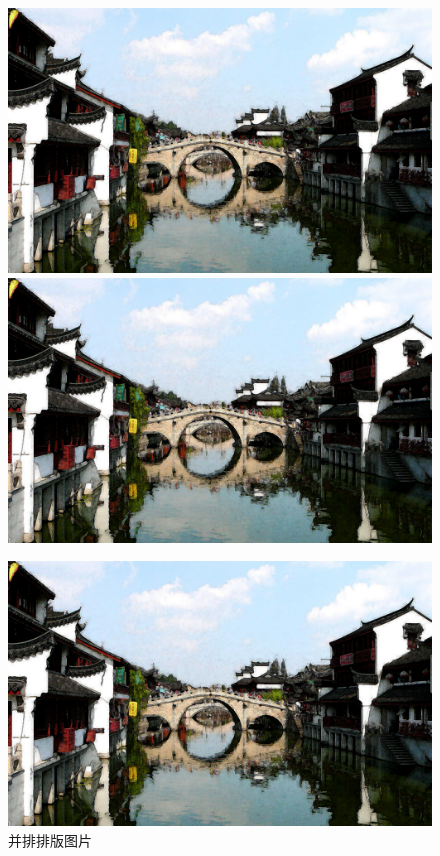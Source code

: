 \documentclass[utf8]{book}
\begin{document}
			\begin{figure}[htbp]
				\centering
				\includegraphics[scale=0.05]{house.jpeg}
				\qquad
				\includegraphics[scale=0.05]{house.jpeg}
				
				\includegraphics[scale=0.12]{house.jpeg}
				\caption{并排排版图片}
			\end{figure}
			
\end{document}
